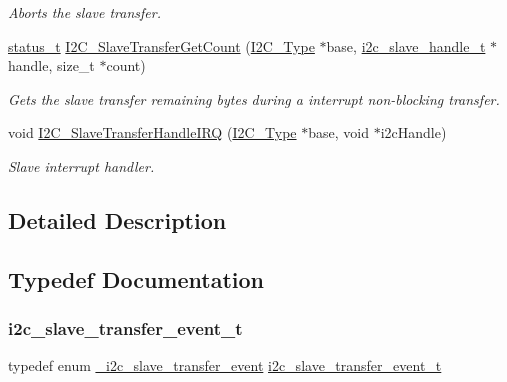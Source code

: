 \begin{DoxyCompactItemize}
\begin{DoxyCompactList}\small\item\em Aborts the slave transfer. \end{DoxyCompactList}\item 
\mbox{\hyperlink{group__ksdk__common_gaaabdaf7ee58ca7269bd4bf24efcde092}{status\+\_\+t}} \mbox{\hyperlink{group__i2c__driver_gabf38a498bd3527ea0b7cc947ae71e17e}{I2\+C\+\_\+\+Slave\+Transfer\+Get\+Count}} (\mbox{\hyperlink{struct_i2_c___type}{I2\+C\+\_\+\+Type}} $\ast$base, \mbox{\hyperlink{group__i2c__driver_ga394e5278816efe62815de9d25be84752}{i2c\+\_\+slave\+\_\+handle\+\_\+t}} $\ast$handle, size\+\_\+t $\ast$count)
\begin{DoxyCompactList}\small\item\em Gets the slave transfer remaining bytes during a interrupt non-\/blocking transfer. \end{DoxyCompactList}\item 
void \mbox{\hyperlink{group__i2c__driver_ga097c0b20503381de44cccba311dcf236}{I2\+C\+\_\+\+Slave\+Transfer\+Handle\+I\+RQ}} (\mbox{\hyperlink{struct_i2_c___type}{I2\+C\+\_\+\+Type}} $\ast$base, void $\ast$i2c\+Handle)
\begin{DoxyCompactList}\small\item\em Slave interrupt handler. \end{DoxyCompactList}\end{DoxyCompactItemize}


\subsection{Detailed Description}


\subsection{Typedef Documentation}
\mbox{\label{group__i2c__driver_ga95f120f6a73af41648364538cf9a6eca}} 
\subsubsection{\texorpdfstring{i2c\_slave\_transfer\_event\_t}{i2c\_slave\_transfer\_event\_t}}
{\footnotesize\ttfamily typedef enum \mbox{\hyperlink{group__i2c__driver_ga87e42e170b60f17f657ef3c06a918133}{\+\_\+i2c\+\_\+slave\+\_\+transfer\+\_\+event}}  \mbox{\hyperlink{group__i2c__driver_ga95f120f6a73af41648364538cf9a6eca}{i2c\+\_\+slave\+\_\+transfer\+\_\+event\+\_\+t}}}



